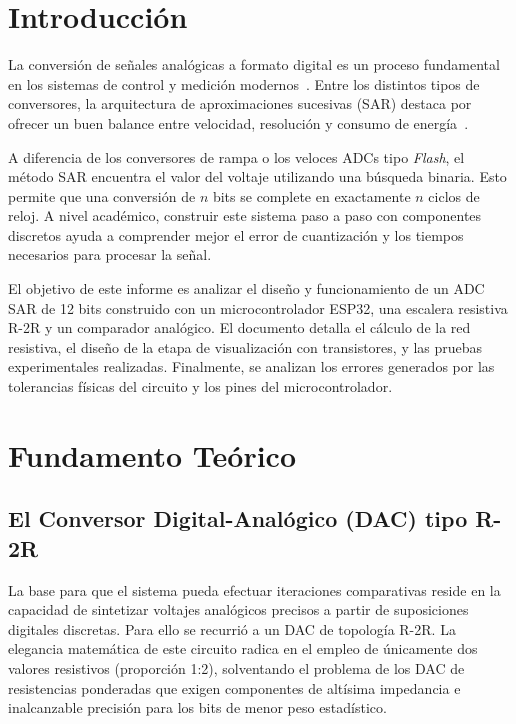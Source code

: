 \documentclass[conference]{IEEEtran}
\begin{document}
\section{Introducción}

La conversión de señales analógicas a formato digital es un proceso fundamental en los sistemas de control y medición modernos~\cite{Pavan2024}. Entre los distintos tipos de conversores, la arquitectura de aproximaciones sucesivas (SAR) destaca por ofrecer un buen balance entre velocidad, resolución y consumo de energía~\cite{Huang2025}. 

A diferencia de los conversores de rampa o los veloces ADCs tipo \textit{Flash}, el método SAR encuentra el valor del voltaje utilizando una búsqueda binaria. Esto permite que una conversión de $n$ bits se complete en exactamente $n$ ciclos de reloj. A nivel académico, construir este sistema paso a paso con componentes discretos ayuda a comprender mejor el error de cuantización y los tiempos necesarios para procesar la señal.

El objetivo de este informe es analizar el diseño y funcionamiento de un ADC SAR de 12 bits construido con un microcontrolador ESP32, una escalera resistiva R-2R y un comparador analógico. El documento detalla el cálculo de la red resistiva, el diseño de la etapa de visualización con transistores, y las pruebas experimentales realizadas. Finalmente, se analizan los errores generados por las tolerancias físicas del circuito y los pines del microcontrolador.

\section{Fundamento Teórico}

\subsection{El Conversor Digital-Analógico (DAC) tipo R-2R}
La base para que el sistema pueda efectuar iteraciones comparativas reside en la capacidad de sintetizar voltajes analógicos precisos a partir de suposiciones digitales discretas. Para ello se recurrió a un DAC de topología R-2R. La elegancia matemática de este circuito radica en el empleo de únicamente dos valores resistivos (proporción 1:2), solventando el problema de los DAC de resistencias ponderadas que exigen componentes de altísima impedancia e inalcanzable precisión para los bits de menor peso estadístico.
\end{document}
